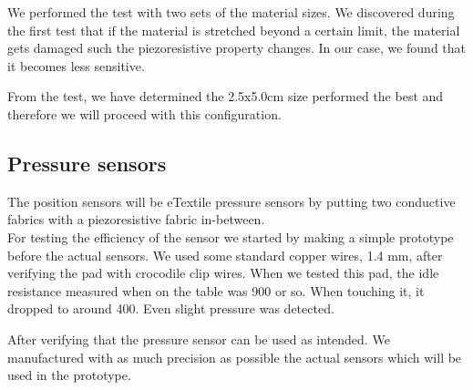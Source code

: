 \documentclass{sigchi-ext}
\begin{document}
We performed the test with two sets of the material sizes. 
We discovered during the first test that if the material
is stretched beyond a certain limit, the material gets 
damaged such the piezoresistive property changes. In our case,
we found that it becomes less sensitive.

From the test, we have determined the 2.5x5.0cm size 
performed the best and therefore we will proceed with this 
configuration.

\subsection{Pressure sensors}
The position sensors will be eTextile pressure sensors by putting two conductive
fabrics with a piezoresistive fabric in-between.\\
For testing
the efficiency of the sensor we started by making a 
simple prototype before the actual sensors.
We used some standard copper wires, 1.4 mm, after verifying the pad with
crocodile clip wires. When we tested this pad, the idle resistance measured when on the table was
900 or so. When touching it, it dropped to around 400. Even slight pressure
was detected.


After verifying that the pressure sensor can be used as 
intended. We manufactured with as much precision as possible
the actual sensors which will be used in the prototype. 
\end{document}
